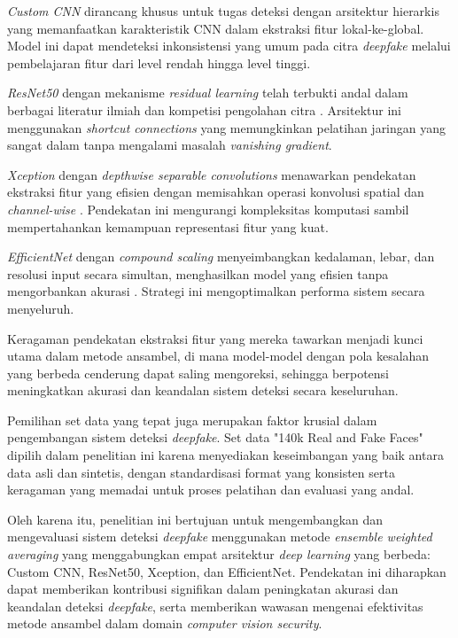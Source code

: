 \textit{Custom CNN} dirancang khusus untuk tugas deteksi dengan arsitektur hierarkis yang memanfaatkan karakteristik CNN dalam ekstraksi fitur lokal-ke-global. Model ini dapat mendeteksi inkonsistensi yang umum pada citra \textit{deepfake} melalui pembelajaran fitur dari level rendah hingga level tinggi.

\textit{ResNet50} dengan mekanisme \textit{residual learning} telah terbukti andal dalam berbagai literatur ilmiah dan kompetisi pengolahan citra \cite{he2016deep}. Arsitektur ini menggunakan \textit{shortcut connections} yang memungkinkan pelatihan jaringan yang sangat dalam tanpa mengalami masalah \textit{vanishing gradient}.

\textit{Xception} dengan \textit{depthwise separable convolutions} menawarkan pendekatan ekstraksi fitur yang efisien dengan memisahkan operasi konvolusi spatial dan \textit{channel-wise} \cite{chollet2017xception}. Pendekatan ini mengurangi kompleksitas komputasi sambil mempertahankan kemampuan representasi fitur yang kuat.

\textit{EfficientNet} dengan \textit{compound scaling} menyeimbangkan kedalaman, lebar, dan resolusi input secara simultan, menghasilkan model yang efisien tanpa mengorbankan akurasi \cite{tan2019efficientnet}. Strategi ini mengoptimalkan performa sistem secara menyeluruh.

Keragaman pendekatan ekstraksi fitur yang mereka tawarkan menjadi kunci utama dalam metode ansambel, di mana model-model dengan pola kesalahan yang berbeda cenderung dapat saling mengoreksi, sehingga berpotensi meningkatkan akurasi dan keandalan sistem deteksi secara keseluruhan.

Pemilihan set data yang tepat juga merupakan faktor krusial dalam pengembangan sistem deteksi \textit{deepfake}. Set data "140k Real and Fake Faces" dipilih dalam penelitian ini karena menyediakan keseimbangan yang baik antara data asli dan sintetis, dengan standardisasi format yang konsisten serta keragaman yang memadai untuk proses pelatihan dan evaluasi yang andal.

Oleh karena itu, penelitian ini bertujuan untuk mengembangkan dan mengevaluasi sistem deteksi \textit{deepfake} menggunakan metode \textit{ensemble weighted averaging} yang menggabungkan empat arsitektur \textit{deep learning} yang berbeda: Custom CNN, ResNet50, Xception, dan EfficientNet. Pendekatan ini diharapkan dapat memberikan kontribusi signifikan dalam peningkatan akurasi dan keandalan deteksi \textit{deepfake}, serta memberikan wawasan mengenai efektivitas metode ansambel dalam domain \textit{computer vision security}.

